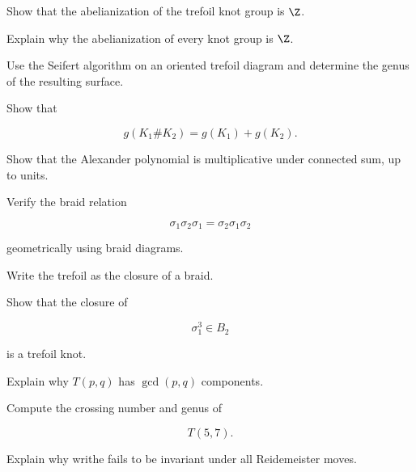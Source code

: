 \begin{exercise}[3]
Show that the abelianization of the trefoil knot group is \(\Z\).
\end{exercise}

\begin{exercise}[3]
Explain why the abelianization of every knot group is \(\Z\).
\end{exercise}

\begin{exercise}[3]
Use the Seifert algorithm on an oriented trefoil diagram and determine the
genus of the resulting surface.
\end{exercise}

\begin{exercise}[3]
Show that

\[
g(K_1\#K_2)
=
g(K_1)+g(K_2).
\]
\end{exercise}

\begin{exercise}[3]
Show that the Alexander polynomial is multiplicative under connected sum,
up to units.
\end{exercise}

\begin{exercise}[3]
Verify the braid relation

\[
\sigma_1\sigma_2\sigma_1
=
\sigma_2\sigma_1\sigma_2
\]

geometrically using braid diagrams.
\end{exercise}

\begin{exercise}[3]
Write the trefoil as the closure of a braid.
\end{exercise}

\begin{exercise}[3]
Show that the closure of

\[
\sigma_1^3\in B_2
\]

is a trefoil knot.
\end{exercise}

\begin{exercise}[3]
Explain why \(T(p,q)\) has \(\gcd(p,q)\) components.
\end{exercise}

\begin{exercise}[3]
Compute the crossing number and genus of

\[
T(5,7).
\]
\end{exercise}

\begin{exercise}[3]
Explain why writhe fails to be invariant under all Reidemeister moves.
\end{exercise}

